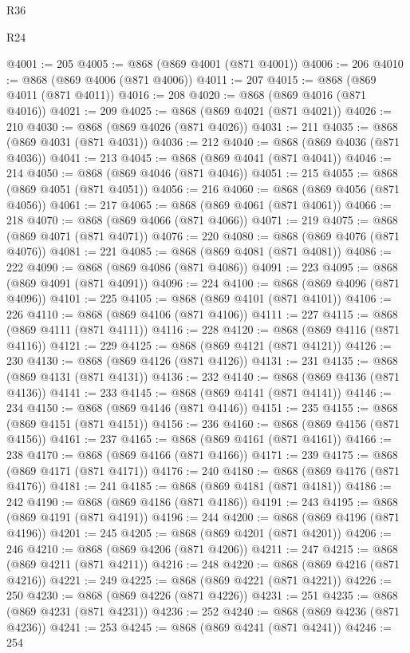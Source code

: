 \begin{lexlean}{R36}
\begin{lexlean}{R24}
\begin{coremodule}
{{{{{{{{{{{{{{{{{{{{{{{{{{{{{{{{{{{{{{{{{{{{{{{{{{{{{{{{{{{{{{{{{{{{{{{{{{{{{{{{{{{{{{{{{{{{{{{{{{{{{{{{{{{{{{{{{{{{{{{{{{{{{{{{{{{{{{{{{{{{{{{{{{{{{{{{{{{{{{{{{{{{{{{{{{{{{{{{{{{{{{{{{{{{{{{{{{{@4001 := 205
@4005 := @868 (@869 @4001 (@871 @4001))
@4006 := 206
@4010 := @868 (@869 @4006 (@871 @4006))
@4011 := 207
@4015 := @868 (@869 @4011 (@871 @4011))
@4016 := 208
@4020 := @868 (@869 @4016 (@871 @4016))
@4021 := 209
@4025 := @868 (@869 @4021 (@871 @4021))
@4026 := 210
@4030 := @868 (@869 @4026 (@871 @4026))
@4031 := 211
@4035 := @868 (@869 @4031 (@871 @4031))
@4036 := 212
@4040 := @868 (@869 @4036 (@871 @4036))
@4041 := 213
@4045 := @868 (@869 @4041 (@871 @4041))
@4046 := 214
@4050 := @868 (@869 @4046 (@871 @4046))
@4051 := 215
@4055 := @868 (@869 @4051 (@871 @4051))
@4056 := 216
@4060 := @868 (@869 @4056 (@871 @4056))
@4061 := 217
@4065 := @868 (@869 @4061 (@871 @4061))
@4066 := 218
@4070 := @868 (@869 @4066 (@871 @4066))
@4071 := 219
@4075 := @868 (@869 @4071 (@871 @4071))
@4076 := 220
@4080 := @868 (@869 @4076 (@871 @4076))
@4081 := 221
@4085 := @868 (@869 @4081 (@871 @4081))
@4086 := 222
@4090 := @868 (@869 @4086 (@871 @4086))
@4091 := 223
@4095 := @868 (@869 @4091 (@871 @4091))
@4096 := 224
@4100 := @868 (@869 @4096 (@871 @4096))
@4101 := 225
@4105 := @868 (@869 @4101 (@871 @4101))
@4106 := 226
@4110 := @868 (@869 @4106 (@871 @4106))
@4111 := 227
@4115 := @868 (@869 @4111 (@871 @4111))
@4116 := 228
@4120 := @868 (@869 @4116 (@871 @4116))
@4121 := 229
@4125 := @868 (@869 @4121 (@871 @4121))
@4126 := 230
@4130 := @868 (@869 @4126 (@871 @4126))
@4131 := 231
@4135 := @868 (@869 @4131 (@871 @4131))
@4136 := 232
@4140 := @868 (@869 @4136 (@871 @4136))
@4141 := 233
@4145 := @868 (@869 @4141 (@871 @4141))
@4146 := 234
@4150 := @868 (@869 @4146 (@871 @4146))
@4151 := 235
@4155 := @868 (@869 @4151 (@871 @4151))
@4156 := 236
@4160 := @868 (@869 @4156 (@871 @4156))
@4161 := 237
@4165 := @868 (@869 @4161 (@871 @4161))
@4166 := 238
@4170 := @868 (@869 @4166 (@871 @4166))
@4171 := 239
@4175 := @868 (@869 @4171 (@871 @4171))
@4176 := 240
@4180 := @868 (@869 @4176 (@871 @4176))
@4181 := 241
@4185 := @868 (@869 @4181 (@871 @4181))
@4186 := 242
@4190 := @868 (@869 @4186 (@871 @4186))
@4191 := 243
@4195 := @868 (@869 @4191 (@871 @4191))
@4196 := 244
@4200 := @868 (@869 @4196 (@871 @4196))
@4201 := 245
@4205 := @868 (@869 @4201 (@871 @4201))
@4206 := 246
@4210 := @868 (@869 @4206 (@871 @4206))
@4211 := 247
@4215 := @868 (@869 @4211 (@871 @4211))
@4216 := 248
@4220 := @868 (@869 @4216 (@871 @4216))
@4221 := 249
@4225 := @868 (@869 @4221 (@871 @4221))
@4226 := 250
@4230 := @868 (@869 @4226 (@871 @4226))
@4231 := 251
@4235 := @868 (@869 @4231 (@871 @4231))
@4236 := 252
@4240 := @868 (@869 @4236 (@871 @4236))
@4241 := 253
@4245 := @868 (@869 @4241 (@871 @4241))
@4246 := 254
}}}}}}}}}}}}}}}}}}}}}}}}}}}}}}}}}}}}}}}}}}}}}}}}}}}}}}}}}}}}}}}}}}}}}}}}}}}}}}}}}}}}}}}}}}}}}}}}}}}}}}}}}}}}}}}}}}}}}}}}}}}}}}}}}}}}}}}}}}}}}}}}}}}}}}}}}}}}}}}}}}}}}}}}}}}}}}}}}}}}}}}}}}}}}}}}}}}
\end{coremodule}
\end{lexlean}
\end{lexlean}
